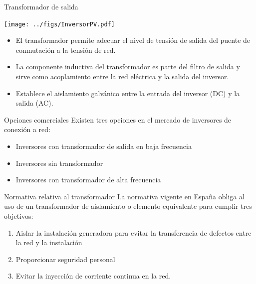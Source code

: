 \documentclass[xcolor={usenames,svgnames,dvipsnames}]{beamer}
\begin{document}
\begin{frame}[label={sec:org1ea7fb2}]{Transformador de salida}
\begin{center}
\texttt{[image: ../figs/InversorPV.pdf]}
\end{center}

\begin{itemize}
\item El transformador permite adecuar el nivel de tensión de salida del
puente de conmutación a la tensión de red.

\item La componente inductiva del transformador es parte del filtro de
salida y sirve como acoplamiento entre la red eléctrica y la salida
del inversor.

\item Establece el aislamiento galvánico entre la entrada del inversor (DC)
y la salida (AC).
\end{itemize}
\end{frame}

\begin{frame}[label={sec:orgf6610cc}]{Opciones comerciales}
Existen tres opciones en el mercado de inversores de conexión a red:

\begin{itemize}
\item Inversores con transformador de salida en baja frecuencia

\item Inversores sin transformador

\item Inversores con transformador de alta frecuencia
\end{itemize}
\end{frame}

\begin{frame}[label={sec:orgbe4e297}]{Normativa relativa al transformador}
La normativa vigente en España obliga al uso de un transformador de aislamiento o elemento equivalente para cumplir tres objetivos:

\begin{enumerate}
\item Aislar la instalación generadora para evitar la transferencia de defectos entre la red y la instalación

\item Proporcionar seguridad personal

\item Evitar la inyección de corriente continua en la red.
\end{enumerate}
\end{frame}
\end{document}
